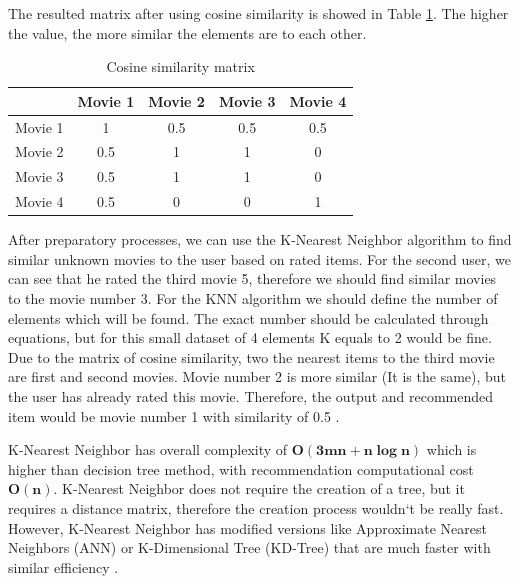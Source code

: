 The resulted matrix after using cosine similarity is showed in Table \ref{tab:cosine_similarity_matrix}. The higher the value, the more similar the elements are to each other.
\begin{table}[h]
    \centering
    \begin{tabular}{|c|c|c|c|c|}
        \hline
         & Movie 1 & Movie 2 & Movie 3 & Movie 4 \\        
        \hline
        Movie 1 &1		&0.5	&0.5	&0.5\\
        \hline	
        Movie 2 &0.5	&1      &1		&0	\\
        \hline
        Movie 3 &0.5	&1		&1		&0	\\
        \hline
        Movie 4 &0.5	&0		&0		&1	\\
        \hline
    \end{tabular}
    \caption{Cosine similarity matrix}\label{tab:cosine_similarity_matrix}
\end{table}

After preparatory processes, we can use the K-Nearest Neighbor algorithm to find similar unknown movies to the user based on rated items. For the second user, we can see that he rated the third movie 5, therefore we should find similar movies to the movie number 3. For the KNN algorithm we should define the number of elements which will be found. The exact number should be calculated through equations, but for this small dataset of 4 elements K equals to 2 would be fine. Due to the matrix of cosine similarity, two the nearest items to the third movie are first and second movies. Movie number 2 is more similar (It is the same), but the user has already rated this movie. Therefore, the output and recommended item would be movie number 1 with similarity of 0.5 .

K-Nearest Neighbor has overall complexity of  $\boldsymbol{O(3mn + n \log n)}$ \cite{KNN_complexity} which is higher than decision tree method, with recommendation computational cost $\mathbf{O(n)}$. K-Nearest Neighbor does not require the creation of a tree, but it requires a distance matrix, therefore the creation process wouldn`t be really fast. However, K-Nearest Neighbor has modified versions like Approximate Nearest Neighbors (ANN) or K-Dimensional Tree (KD-Tree) that are much faster with similar efficiency \cite{KNN_modifications}.
